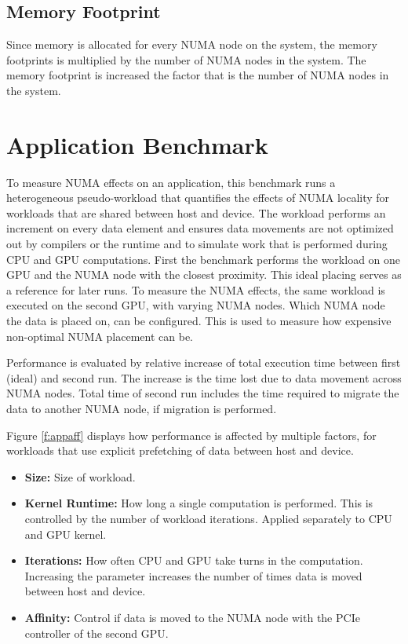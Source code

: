 \subsection{Memory Footprint}
Since memory is allocated for every NUMA node on the system, the memory footprints is multiplied by the number of NUMA nodes
in the system. The memory footprint is increased the factor that is the number of NUMA nodes in the system. 

\section{Application Benchmark}
To measure NUMA effects on an application, this benchmark runs a heterogeneous  pseudo-workload that quantifies the effects of NUMA locality for workloads that are shared between host and device. The workload performs an increment on every data element and ensures data movements are not optimized out by compilers
or the runtime and to simulate work that is performed during CPU and GPU computations.
First the benchmark performs the workload on one GPU and the NUMA node with the closest proximity. This ideal placing
serves as a reference for later runs. 
To measure the NUMA effects, the same workload is executed on the second GPU, with varying NUMA nodes. Which NUMA node the data is placed on, can be configured. This is used to measure how expensive non-optimal NUMA placement can be.

Performance is evaluated by relative increase of total execution time between first (ideal) and second run. 
The increase is the time lost due to data movement across NUMA nodes. Total time of second run includes
the time required to migrate the data to another NUMA node, if migration is performed.

Figure \ref{f:appaff} displays how performance is affected by multiple factors, for workloads that use
explicit prefetching of data between host and device.
\begin{itemize}
	\item \textbf{Size:} Size of workload.  
	\item \textbf{Kernel Runtime:} How long a single computation is performed. This is controlled by the number of workload iterations. Applied separately to CPU and GPU kernel.
	\item \textbf{Iterations:} How often CPU and GPU take turns in the computation. Increasing the parameter increases the number of times data is moved between host and device.
	\item \textbf{Affinity:} Control if data is moved to the NUMA node with the PCIe controller of the second GPU.
\end{itemize}

